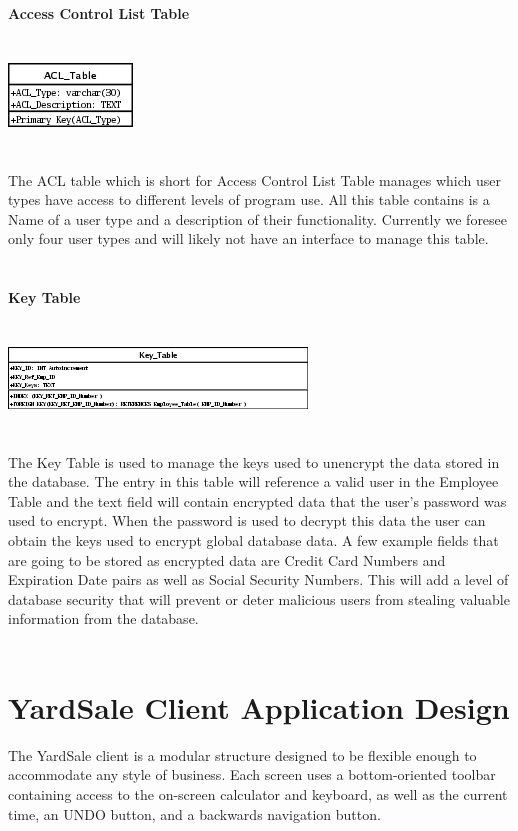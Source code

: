 \documentclass{report}
\begin{document}
        {\bf Access Control List Table}\\
        \\
        \\
        \includegraphics{Tables/ACL.png}\\
        \\
        \\
        The ACL table which is short for Access Control List Table manages which user types have access
        to different levels of program use. All this table contains is a Name of a user type and a description
        of their functionality. Currently we foresee only four user types and will likely not have an
        interface to manage this table.\\
        \\
        \\
        {\bf Key Table}\\
        \\
        \\
        \includegraphics{Tables/KeyTable.png}\\
        \\
        \\
        The Key Table is used to manage the keys used to unencrypt the data stored in the database. The
        entry in this table will reference a valid user in the Employee Table and the text field will
        contain encrypted data that the user's password was used to encrypt. When the password is used
        to decrypt this data the user can obtain the keys used to encrypt global database data. A few
        example fields that are going to be stored as encrypted data are Credit Card Numbers and Expiration
        Date pairs as well as Social Security Numbers. This will add a level of database security that
        will prevent or deter malicious users from stealing valuable information from the database.\\
        \\

    \newpage

    \section{YardSale Client Application Design}
    The YardSale client is a modular structure designed to
    be flexible enough to accommodate any style of business.
    Each screen uses a bottom-oriented toolbar containing access
    to the on-screen calculator and keyboard, as well as the
    current time, an UNDO button, and a backwards navigation
    button.\\
\end{document}
